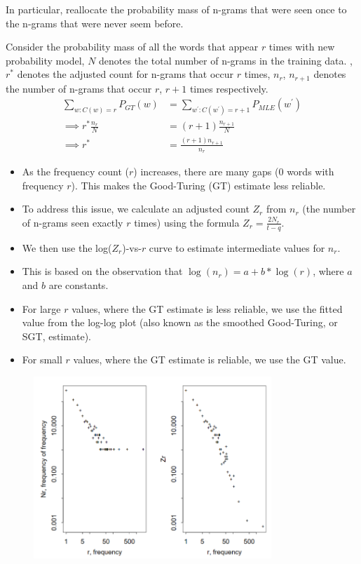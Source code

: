 \documentclass[12pt]{article}
\begin{document}
            In particular, reallocate the probability mass of n-grams that were seen once to the n-grams that were never seem before.
            
            Consider the probability mass of all the words that appear $r$ times with new probability model, $N$ denotes the total number of n-grams in the training data.
            ,$r^*$ denotes the adjusted count for n-grams that occur $r$ times, $n_r$, $n_{r+1}$ denotes the number of n-grams that occur $r$, $r+1$ times respectively.
            \begin{align*}
                \sum_{w : C(w) = r} P_{GT}(w) &= \sum_{w^{'} : C(w^{'}) = r+1} P_{MLE}(w^{'}) \\
                \implies r^* \frac{n_{r}}{N} &= (r+1) \frac{n_{r+1}}{N} \\
                \implies r^*  &= \frac{(r + 1) n_{r+1}}{n_r}
            \end{align*}
            \begin{itemize}
                \item As the frequency count ($r$) increases, there are many gaps (0 words with frequency $r$). This makes the Good-Turing (GT) estimate less reliable.
                \item To address this issue, we calculate an adjusted count $Z_r$ from $n_r$ (the number of n-grams seen exactly $r$ times) using the formula $Z_r = \frac{2N_r}{t-q}$.
                \item We then use the log($Z_r$)-vs-$r$ curve to estimate intermediate values for $n_r$.
                \item This is based on the observation that $\log(n_r) = a + b*\log(r)$, where $a$ and $b$ are constants.
                \item For large $r$ values, where the GT estimate is less reliable, we use the fitted value from the log-log plot (also known as the smoothed Good-Turing, or SGT, estimate).
                \item For small $r$ values, where the GT estimate is reliable, we use the GT value.
            \end{itemize}
            \begin{figure}[h]
                \centering
                \includegraphics[width=0.8\textwidth]{images/GT.png}
            \end{figure}
            
\end{document}
